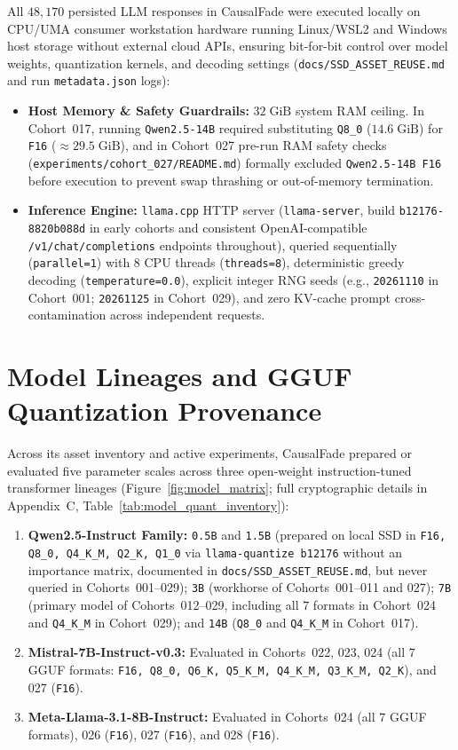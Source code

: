 All $48{,}170$ persisted LLM responses in CausalFade were executed locally on CPU/UMA consumer workstation hardware running Linux/WSL2 and Windows host storage without external cloud APIs, ensuring bit-for-bit control over model weights, quantization kernels, and decoding settings (\texttt{docs/SSD\_ASSET\_REUSE.md} and run \texttt{metadata.json} logs):
\begin{itemize}
  \item \textbf{Host Memory \& Safety Guardrails:} $32\;\text{GiB}$ system RAM ceiling. In Cohort~017, running \texttt{Qwen2.5-14B} required substituting \texttt{Q8\_0} ($14.6\;\text{GiB}$) for \texttt{F16} ($\approx 29.5\;\text{GiB}$), and in Cohort~027 pre-run RAM safety checks (\texttt{experiments/cohort\_027/README.md}) formally excluded \texttt{Qwen2.5-14B F16} before execution to prevent swap thrashing or out-of-memory termination.
  \item \textbf{Inference Engine:} \texttt{llama.cpp} HTTP server (\texttt{llama-server}, build \texttt{b12176-8820b088d} in early cohorts and consistent OpenAI-compatible \texttt{/v1/chat/completions} endpoints throughout), queried sequentially (\texttt{parallel=1}) with $8$ CPU threads (\texttt{threads=8}), deterministic greedy decoding (\texttt{temperature=0.0}), explicit integer RNG seeds (e.g., \texttt{20261110} in Cohort~001; \texttt{20261125} in Cohort~029), and zero KV-cache prompt cross-contamination across independent requests.
\end{itemize}

\section{Model Lineages and GGUF Quantization Provenance}

Across its asset inventory and active experiments, CausalFade prepared or evaluated five parameter scales across three open-weight instruction-tuned transformer lineages (Figure~\ref{fig:model_matrix}; full cryptographic details in Appendix~C, Table~\ref{tab:model_quant_inventory}):
\begin{enumerate}
  \item \textbf{Qwen2.5-Instruct Family:} \texttt{0.5B} and \texttt{1.5B} (prepared on local SSD in \texttt{F16, Q8\_0, Q4\_K\_M, Q2\_K, Q1\_0} via \texttt{llama-quantize b12176} without an importance matrix, documented in \texttt{docs/SSD\_ASSET\_REUSE.md}, but never queried in Cohorts~001--029); \texttt{3B} (workhorse of Cohorts~001--011 and 027); \texttt{7B} (primary model of Cohorts~012--029, including all $7$ formats in Cohort~024 and \texttt{Q4\_K\_M} in Cohort~029); and \texttt{14B} (\texttt{Q8\_0} and \texttt{Q4\_K\_M} in Cohort~017).
  \item \textbf{Mistral-7B-Instruct-v0.3:} Evaluated in Cohorts~022, 023, 024 (all $7$ GGUF formats: \texttt{F16, Q8\_0, Q6\_K, Q5\_K\_M, Q4\_K\_M, Q3\_K\_M, Q2\_K}), and 027 (\texttt{F16}).
  \item \textbf{Meta-Llama-3.1-8B-Instruct:} Evaluated in Cohorts~024 (all $7$ GGUF formats), 026 (\texttt{F16}), 027 (\texttt{F16}), and 028 (\texttt{F16}).
\end{enumerate}

